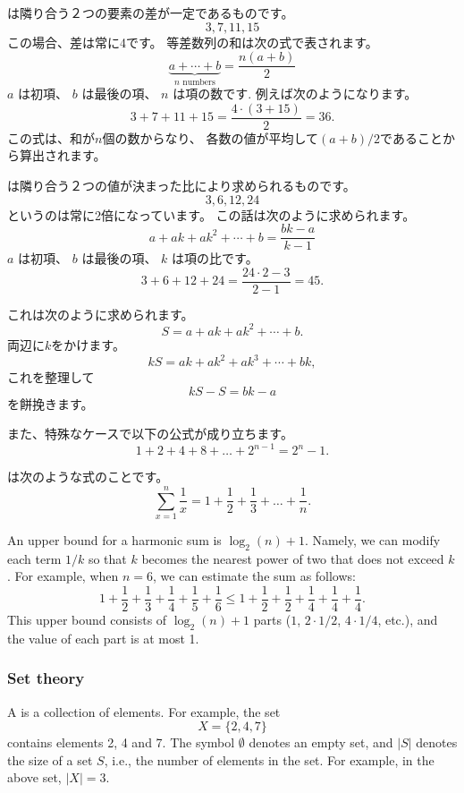 
は隣り合う２つの要素の差が一定であるものです。
\[3, 7, 11, 15\]
この場合、差は常に4です。
等差数列の和は次の式で表されます。
\[\underbrace{a + \cdots + b}_{n \,\, \textrm{numbers}} = \frac{n(a+b)}{2}\]
$a$ は初項、
$b$ は最後の項、
$n$ は項の数です.
例えば次のようになります。
\[3+7+11+15=\frac{4 \cdot (3+15)}{2} = 36.\]
この式は、和が$n$個の数からなり、
各数の値が平均して$(a+b)/2$であることから算出されます。

は隣り合う２つの値が決まった比により求められるものです。
\[3,6,12,24\]
というのは常に2倍になっています。
この話は次のように求められます。
\[a + ak + ak^2 + \cdots + b = \frac{bk-a}{k-1}\]
$a$ は初項、
$b$ は最後の項、
$k$ は項の比です。
\[3+6+12+24=\frac{24 \cdot 2 - 3}{2-1} = 45.\]

これは次のように求められます。
\[ S = a + ak + ak^2 + \cdots + b .\]
両辺に$k$をかけます。
\[ kS = ak + ak^2 + ak^3 + \cdots + bk,\]
これを整理して
\[ kS-S = bk-a\]
を餅挽きます。

また、特殊なケースで以下の公式が成り立ちます。
\[1+2+4+8+\ldots+2^{n-1}=2^n-1.\]


 は次のような式のことです。
\[ \sum_{x=1}^n \frac{1}{x} = 1+\frac{1}{2}+\frac{1}{3}+\ldots+\frac{1}{n}.\]

An upper bound for a harmonic sum is $\log_2(n)+1$.
Namely, we can
modify each term $1/k$ so that $k$ becomes
the nearest power of two that does not exceed $k$.
For example, when $n=6$, we can estimate
the sum as follows:
\[ 1+\frac{1}{2}+\frac{1}{3}+\frac{1}{4}+\frac{1}{5}+\frac{1}{6} \le
1+\frac{1}{2}+\frac{1}{2}+\frac{1}{4}+\frac{1}{4}+\frac{1}{4}.\]
This upper bound consists of $\log_2(n)+1$ parts
($1$, $2 \cdot 1/2$, $4 \cdot 1/4$, etc.),
and the value of each part is at most 1.

\subsubsection{Set theory}


A  is a collection of elements.
For example, the set
\[X=\{2,4,7\}\]
contains elements 2, 4 and 7.
The symbol $\emptyset$ denotes an empty set,
and $|S|$ denotes the size of a set $S$,
i.e., the number of elements in the set.
For example, in the above set, $|X|=3$.

